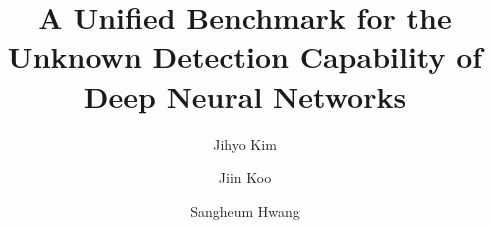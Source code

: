 \documentclass[preprint,12pt]{elsarticle}
\begin{document}
\begin{frontmatter}



\title{A Unified Benchmark for the Unknown Detection Capability of Deep Neural Networks}



\author[alpha]{Jihyo Kim}
\author[alpha]{Jiin Koo}
\author[alpha]{Sangheum Hwang}
\address[alpha]{Department of Data Science, Seoul National University of Science and Technology, \\
Seoul 01811, Republic of Korea}



\end{frontmatter}
\end{document}
